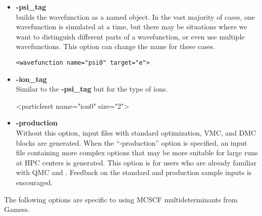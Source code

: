 \begin{itemize}
\item \textbf{-psi\_tag}\\
\qmcpack builds the wavefunction as a named object. In the vast majority of cases, one wavefunction is simulated at a time, but there may be situations where we want to distinguish different parts of a wavefunction, or even use multiple wavefunctions. This option can change the name for these cases. 

\begin{lstlisting}[style=QMCPXML]
   <wavefunction name="psi0" target="e">
\end{lstlisting}

\item \textbf{-ion\_tag} \\
Similar to the \textbf{-psi\_tag} but for the type of ions. \\
\begin{shade}
  <particleset name="ion0" size="2">
\end{shade}


\item \textbf{-production}\\

Without this option, input files with standard optimization, VMC, and
DMC blocks are generated. When the ``-production'' option is
specified, an input file containing more complex options that may be
more suitable for large runs at HPC centers is generated. This option
is for users who are already familiar with QMC and \qmcpack. Feedback
on the standard and production sample inputs is encouraged.


\end{itemize}

The following options are specific to using MCSCF multideterminants from Gamess. 

